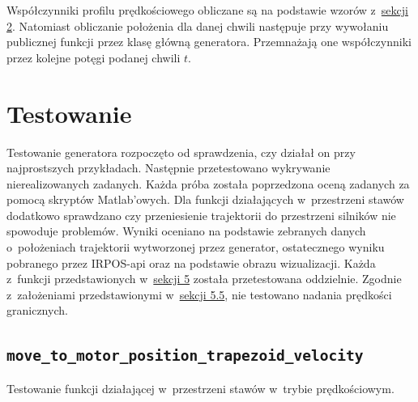 \documentclass[a4paper, 12pt]{article}
\begin{document}
	\par Współczynniki profilu prędkościowego obliczane są na podstawie wzorów z~\hyperref[sec:math]{sekcji 2}. Natomiast obliczanie położenia dla danej chwili następuje przy wywołaniu publicznej funkcji przez klasę główną generatora. Przemnażają one współczynniki przez kolejne potęgi podanej chwili $t$.
	
	\section{Testowanie}
	Testowanie generatora rozpoczęto od sprawdzenia, czy działał on przy najprostszych przykładach. Następnie przetestowano wykrywanie nierealizowanych zadanych. Każda próba została poprzedzona oceną zadanych za pomocą skryptów Matlab'owych. Dla funkcji działających w~przestrzeni stawów dodatkowo sprawdzano czy przeniesienie trajektorii do przestrzeni silników nie spowoduje problemów. Wyniki oceniano na podstawie zebranych danych o~położeniach trajektorii wytworzonej przez generator, ostatecznego wyniku pobranego przez IRPOS-api oraz na podstawie obrazu wizualizacji. Każda z~funkcji przedstawionych w~\hyperref[sec:api]{sekcji 5} została przetestowana oddzielnie. Zgodnie z~założeniami przedstawionymi w~\hyperref[sec:borderVels]{sekcji 5.5}, nie testowano nadania prędkości granicznych.
	\subsection{\texttt{move\_to\_motor\_position\_trapezoid\_velocity}}
	Testowanie funkcji działającej w~przestrzeni stawów w~trybie prędkościowym.
\end{document}
